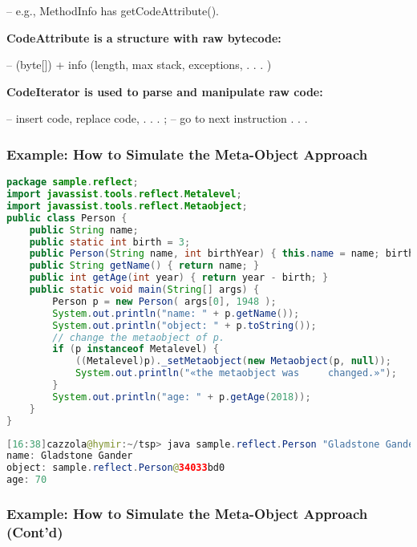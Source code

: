 – e.g., MethodInfo has getCodeAttribute().

\textbf{CodeAttribute is a structure with raw bytecode:}

– (byte[]) + info (length, max stack, exceptions, . . . )

\textbf{CodeIterator is used to parse and manipulate raw code:}

– insert code, replace code, . . . ;
– go to next instruction . . .

\subsubsection{Example: How to Simulate the Meta-Object Approach}

\begin{lstlisting}[language=Java]
package sample.reflect;
import javassist.tools.reflect.Metalevel;
import javassist.tools.reflect.Metaobject;
public class Person {
	public String name;
	public static int birth = 3;
	public Person(String name, int birthYear) { this.name = name; birth = birthYear; }
	public String getName() { return name; }
	public int getAge(int year) { return year - birth; }
	public static void main(String[] args) {
		Person p = new Person( args[0], 1948 );
		System.out.println("name: " + p.getName());
		System.out.println("object: " + p.toString());
		// change the metaobject of p.
		if (p instanceof Metalevel) {
			((Metalevel)p)._setMetaobject(new Metaobject(p, null));
			System.out.println("«the metaobject was 	changed.»");
		}
		System.out.println("age: " + p.getAge(2018));
	}
}
\end{lstlisting}

\begin{lstlisting}[language=Java]
[16:38]cazzola@hymir:~/tsp> java sample.reflect.Person "Gladstone Gander"
name: Gladstone Gander
object: sample.reflect.Person@34033bd0
age: 70
\end{lstlisting}

\subsubsection{Example: How to Simulate the Meta-Object Approach (Cont’d)}